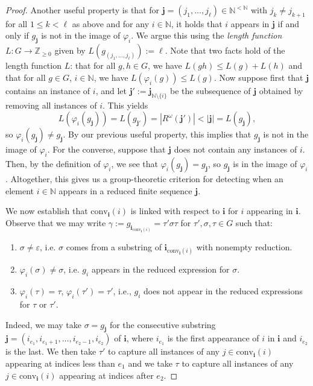 \documentclass[10pt,a4paper]{amsart}
\newcommand{\NN}{\mathbb{N}}
\newcommand{\ZZ}{\mathbb{Z}}
\begin{document}
\begin{proof}
    Another useful property is that for $\mathbf j=(j_1,\dots,j_\ell)\in\NN^{<\NN}$ with $j_k\neq j_{k+1}$ for all $1\leq k<\ell$ as above and for any $i\in\NN$, it holds that $i$ appears in $\mathbf j$ if and only if $g_\mathbf j$ is not in the image of $\varphi_i$. We argue this using the \emph{length function} $L:G\to\ZZ_{\geq0}$ given by $L(g_{(j_1,\dots,j_\ell)}):=\ell$. Note that two facts hold of the length function $L$: that for all $g,h\in G$, we have $L(gh)\leq L(g)+L(h)$ and that for all $g\in G$, $i\in\NN$, we have $L(\varphi_i(g))\leq L(g)$. Now suppose first that $\mathbf j$ contains an instance of $i$, and let $\mathbf j':=\mathbf j_{\NN\setminus\{i\}}$ be the subsequence of $\mathbf j$ obtained by removing all instances of $i$. This yields
    $$L(\varphi_i(g_\mathbf j))=L(g_{\mathbf j'})=|R^\omega(\mathbf j')|<|\mathbf j|=L(g_\mathbf j),$$
    so $\varphi_i(g_\mathbf j)\neq g_\mathbf j$. By our previous useful property, this implies that $g_\mathbf j$ is not in the image of $\varphi_i$. For the converse, suppose that $\mathbf j$ does not contain any instances of $i$. Then, by the definition of $\varphi_i$, we see that $\varphi_i(g_\mathbf j)=g_\mathbf j$, so $g_\mathbf j$ is in the image of $\varphi_i$. Altogether, this gives us a group-theoretic criterion for detecting when an element $i\in\NN$ appears in a reduced finite sequence $\mathbf j$.

    We now establish that $\text{conv}_\mathbf i(i)$ is linked with respect to $\mathbf i$ for $i$ appearing in $\mathbf i$. Observe that we may write $\gamma:=g_{\mathbf i_{\text{conv}_\mathbf i(i)}}=\tau'\sigma\tau$ for $\tau',\sigma,\tau\in G$ such that:
    \begin{enumerate}
        \item $\sigma\neq\varepsilon$, i.e. $\sigma$ comes from a substring of $\mathbf i_{\text{conv}_\mathbf i(i)}$ with nonempty reduction.
        \item $\varphi_i(\sigma)\neq\sigma$, i.e. $g_i$ appears in the reduced expression for $\sigma$.
        \item $\varphi_i(\tau)=\tau$, $\varphi_i(\tau')=\tau'$, i.e., $g_i$ does not appear in the reduced expressions for $\tau$ or $\tau'$.
    \end{enumerate}
    Indeed, we may take $\sigma=g_\mathbf j$ for the consecutive substring $\mathbf j=(i_{e_1},i_{e_1+1},\dots,i_{e_2-1},i_{e_2})$ of $\mathbf i$, where $i_{e_1}$ is the first appearance of $i$ in $\mathbf i$ and $i_{e_2}$ is the last. We then take $\tau'$ to capture all instances of any $j\in\text{conv}_\mathbf i(i)$ appearing at indices less than $e_1$ and we take $\tau$ to capture all instances of any $j\in\text{conv}_\mathbf i(i)$ appearing at indices after $e_2$.
    

\end{proof}
\end{document}
